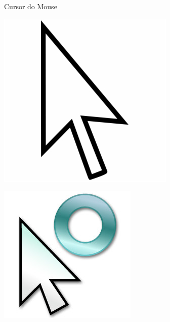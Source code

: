 \begin{frame}{Cursor do Mouse}
	\begin{minipage}{0.24\linewidth}
		\centering
		\includegraphics[width=0.8\linewidth]{Figuras/Ch02/fig15}
	\end{minipage}\hfill
	\begin{minipage}{0.24\linewidth}
		\centering
		\includegraphics[width=0.9\linewidth]{Figuras/Ch02/fig16}
	\end{minipage}\hfill
	\begin{minipage}{0.24\linewidth}
		\centering

\end{minipage}
\end{frame}
